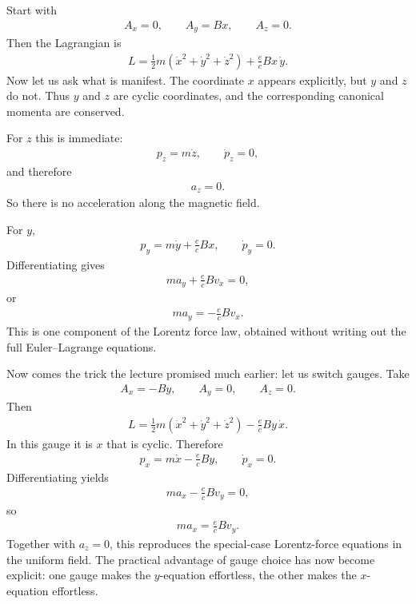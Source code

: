 Start with
\begin{align}
A_x=0,\qquad A_y=Bx,\qquad A_z=0.
\end{align}
Then the Lagrangian is
\begin{align}
L
=
\frac{1}{2}m\left(\dot x^2+\dot y^2+\dot z^2\right)
+
\frac{e}{c}Bx\,\dot y.
\end{align}
Now let us ask what is manifest. The coordinate \(x\) appears explicitly, but \(y\) and \(z\) do not. Thus \(y\) and \(z\) are cyclic coordinates, and the corresponding canonical momenta are conserved.

For \(z\) this is immediate:
\begin{align}
p_z=m\dot z,\qquad \dot p_z=0,
\end{align}
and therefore
\begin{align}
a_z=0.
\end{align}
So there is no acceleration along the magnetic field.

For \(y\),
\begin{align}
p_y=m\dot y+\frac{e}{c}Bx,\qquad \dot p_y=0.
\end{align}
Differentiating gives
\begin{align}
m a_y+\frac{e}{c}B v_x=0,
\end{align}
or
\begin{align}
m a_y=-\frac{e}{c}B v_x.
\end{align}
This is one component of the Lorentz force law, obtained without writing out the full Euler--Lagrange equations.

Now comes the trick the lecture promised much earlier: let us switch gauges. Take
\begin{align}
A_x=-By,\qquad A_y=0,\qquad A_z=0.
\end{align}
Then
\begin{align}
L
=
\frac{1}{2}m\left(\dot x^2+\dot y^2+\dot z^2\right)
-
\frac{e}{c}By\,\dot x.
\end{align}
In this gauge it is \(x\) that is cyclic. Therefore
\begin{align}
p_x=m\dot x-\frac{e}{c}By,\qquad \dot p_x=0.
\end{align}
Differentiating yields
\begin{align}
m a_x-\frac{e}{c}B v_y=0,
\end{align}
so
\begin{align}
m a_x=\frac{e}{c}B v_y.
\end{align}
Together with \(a_z=0\), this reproduces the special-case Lorentz-force equations in the uniform field. The practical advantage of gauge choice has now become explicit: one gauge makes the \(y\)-equation effortless, the other makes the \(x\)-equation effortless.

